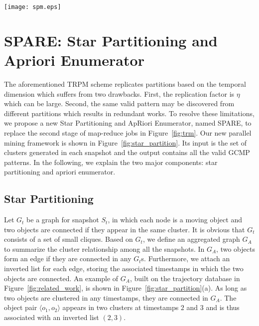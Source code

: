 \begin{figure*}[t]
\centering
\texttt{[image: spm.eps]}
\caption{Star partition and ApRiori Enumerator (SPARE). (a) Aggregated graph from Figure 1. (b) Five stars are generated, star IDs are circled, the vertexes and inverted lists are in the connected tables.
(c) Apriori Enumerator with various pruning techniques.}
\label{fig:star_partition}
\end{figure*}

\section{SPARE: Star Partitioning and Apriori Enumerator}
\label{sec:spm}
The aforementioned TRPM scheme replicates partitions based on the temporal dimension which suffers from two drawbacks. First, the replication factor is $\eta$ which can be large. Second, the same valid pattern may be discovered from different partitions which results in redundant works.
To resolve these limitations,
we propose a new Star Partitioning and ApRiori Enumerator, named SPARE, 
to replace the second stage of map-reduce jobs in Figure~\ref{fig:trm}. 
Our new parallel mining framework is shown in Figure~\ref{fig:star_partition}. 
Its input is the set of clusters generated in each snapshot and the output 
contains all the valid GCMP patterns. In the following, we explain the two major components: 
star partitioning and apriori enumerator.


\subsection{Star Partitioning}
Let $G_t$ be a graph for snapshot $S_t$, in which each node 
is a moving object and two objects are connected if they appear 
in the same cluster. It is obvious that $G_t$ consists of a set of small cliques. 
Based on $G_t$, we define an aggregated graph $G_A$ to summarize the 
cluster relationship among all the snapshots. In $G_A$, two objects
form an edge if they are connected in any $G_t$s. Furthermore, 
we attach an inverted list for each edge, 
storing the associated timestamps in which the two objects are connected. 
An example of $G_A$, built on the trajectory database in Figure~\ref{fig:related_work}, 
is shown in Figure~\ref{fig:star_partition}(a). 
As long as two objects are clustered in any timestamps, they are connected in $G_A$. 
The object pair $\langle o_1,o_2 \rangle$ appears in two clusters at timestamps 
$2$ and $3$ and is thus associated with an inverted list $(2,3)$.



